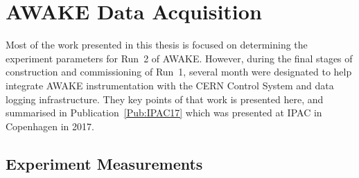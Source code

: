 %
%

\chapter{AWAKE Data Acquisition}
\label{Ch:DAQ}

Most of the work presented in this thesis is focused on determining the experiment parameters for Run~2 of AWAKE.
However, during the final stages of construction and commissioning of Run~1, several month were designated to help integrate AWAKE instrumentation with the CERN Control System and data logging infrastructure.
They key points of that work is presented here, and summarised in Publication~\ref{Pub:IPAC17} which was presented at IPAC in Copenhagen in 2017.

\section{Experiment Measurements}
\label{DAQ:Experiment}

